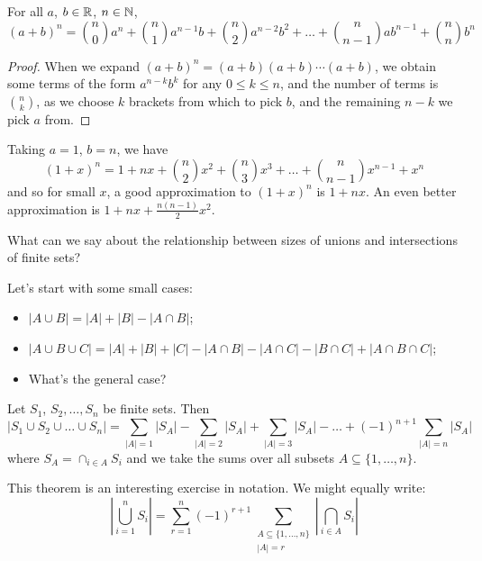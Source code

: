 \documentclass{../../template/note}
\begin{document}
    \begin{theorem}
        For all \(a\), \(b \in \mathbb R\), \(n \in \mathbb N\),
        \[
            (a+b)^n = \binom n 0 a^n + \binom n 1 a^{n-1} b + \binom n 2 a^{n-2} b^2 + \dots + \binom n {n-1} ab^{n-1} + \binom n n b^n
        \]
    \end{theorem}
    
    \begin{proof}
        When we expand \((a+b)^n = (a+b)(a+b)\cdots(a+b)\), we obtain some terms of the form \(a^{n-k}b^k\) for any \(0 \leq k \leq n\), and the number of terms is \(\binom n k\), as we choose \(k\) brackets from which to pick \(b\), and the remaining \(n-k\) we pick \(a\) from.
    \end{proof}

    \begin{example}
        Taking \(a = 1\), \(b = n\), we have
        \[
            (1+x)^n = 1 + nx + \binom n 2 x^2 + \binom n 3 x^3 + \dots + \binom n {n-1} x^{n-1} + x^n
        \]
        and so for small \(x\), a good approximation to \((1+x)^n\) is \(1 + nx\). An even better approximation is \(1 + nx + \frac{n(n-1)}{2}x^2\).
    \end{example}
    
    What can we say about the relationship between sizes of unions and intersections of finite sets?

    Let's start with some small cases:
    \begin{itemize}
        \item \(|A \cup B| = |A| + |B| - |A \cap B|\);
        \item \(|A \cup B \cup C| = |A| + |B| + |C| - |A \cap B| - |A \cap C| - |B \cap C| + |A \cap B \cap C|\);
        \item What's the general case?
    \end{itemize}
    
    \begin{theorem}
        Let \(S_1\), \(S_2, \dots, S_n\) be finite sets. Then
        \[
            |S_1 \cup S_2 \cup \dots \cup S_n| = \sum_{|A| = 1}|S_A| - \sum_{|A| = 2} |S_A| + \sum_{|A| = 3} |S_A| - \dots + (-1)^{n+1} \sum_{|A| = n} |S_A|
        \]
        where \(S_A = \cap_{i \in A} S_i\) and we take the sums over all subsets \(A \subseteq \{1, \dots, n\}\).
    \end{theorem}
    
    \begin{remark*}
        This theorem is an interesting exercise in notation. We might equally write:
        \[
            \left|\bigcup_{i=1}^n S_i\right| = \sum_{r=1}^n (-1)^{r+1} \sum_{\substack{A \subseteq \{1, \dots, n\} \\ |A| = r}} \left|\bigcap_{i \in A} S_i \right|
        \]
    \end{remark*}
    
\end{document}
